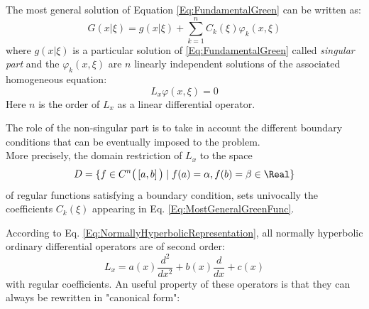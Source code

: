 \documentclass[Main]{subfiles}
\begin{document}
	\begin{remark}
		The most general solution of Equation 	\ref{Eq:FundamentalGreen} can be written as:
		\begin{equation}\label{Eq:MostGeneralGreenFunc}
		G( x \vert \xi) = g(x \vert \xi) + \sum_{k=1}^{n} C_k(\xi) \varphi_k(x,\xi)
		\end{equation}
		where $g(x \vert \xi)$ is a particular solution of \ref{Eq:FundamentalGreen} called \emph{singular part} and the $\varphi_k(x,\xi)$ are $n$ linearly independent solutions of the associated homogeneous equation:
		\begin{displaymath}
			L_x \varphi(x , \xi) = 0
		\end{displaymath}
		Here $n$ is the order of $L_x$ as a linear differential operator.
		
		\vspace{1mm}
		The role of the non-singular part is to take in account the different boundary conditions that can be eventually imposed to the problem.
		\\
		More precisely, the domain restriction of $L_x$ to the space 	
		\begin{displaymath}
			D = \{ f \in C^n \big( \left[a,b\right] \big) \; \vert \; f(a)= \alpha , f(b)=\beta \in \Real\}
		\end{displaymath}
		of regular functions satisfying a boundary condition,
		sets univocally the coefficients $C_k(\xi)$ appearing in Eq. \ref{Eq:MostGeneralGreenFunc}.		
	\end{remark}
	
	According to Eq. \ref{Eq:NormallyHyperbolicRepresentation}, all normally hyperbolic ordinary differential operators are of second order:
	\begin{displaymath}
		L_x = a(x) \frac{d^2}{d x^2} + b(x) \frac{d}{d x} + c(x)	
	\end{displaymath}
	with regular coefficients.
	An useful property of these operators is that they can always be rewritten in "canonical form": 
	
\end{document}
